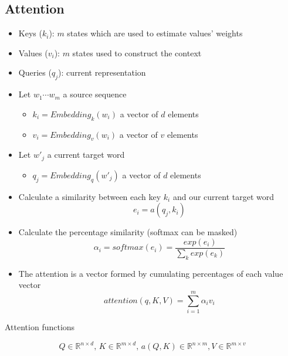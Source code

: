 \documentclass{KBook}
\begin{document}
\subsection{Attention}


	
	\begin{center}
	\end{center}
	
	\vskip-6pt
	\begin{itemize}
		\item Keys ($k_i$): $m$ states which are used to estimate values' weights
		\item Values ($v_i$): $m$ states used to construct the context 
		\item Queries ($q_j$): current representation 
	\end{itemize}
	
	
	\begin{itemize}
		\item Let $ w_1 \cdots w_m $ a source sequence
		\begin{itemize}
			\item $ k_i =  Embedding_k(w_i)$ a vector of $ d $ elements
			\item $ v_i =  Embedding_v(w_i)$ a vector of $ v $ elements
		\end{itemize}
		\item Let $ w'_j $ a current target word
		\begin{itemize}
			\item $ q_j =  Embedding_q(w'_j)$ a vector of $ d $ elements
		\end{itemize}
		\item Calculate a similarity between each key $ k_i $ and our current target word 
		\[e_i = a(q_j, k_i)\]
		\item Calculate the percentage similarity (softmax can be masked)
		\[\alpha_i = softmax(e_i) = \frac{exp(e_i)}{\sum_k exp(e_k)}\] 
		\item The attention is a vector formed by cumulating percentages of each value vector
		\vspace{-6pt}\[attention(q, K, V) = \sum_{i=1}^{m} \alpha_i v_i\]
	\end{itemize}


Attention functions
	
	\[Q \in \mathbb{R}^{n \times d}, \, K \in \mathbb{R}^{m \times d}, \, a(Q, K) \in \mathbb{R}^{n \times m}, V \in \mathbb{R}^{m \times v} \]
	
\end{document}
